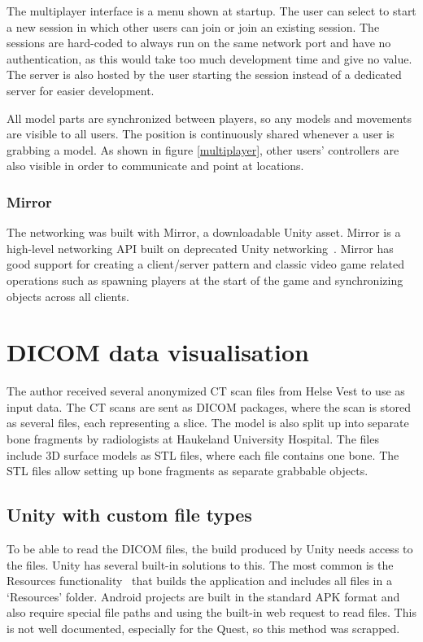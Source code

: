 \documentclass[a4paper]{report}
\begin{document}
The multiplayer interface is a menu shown at startup. The user can select to start a new session in which other users can join or join an existing session. The sessions are hard-coded to always run on the same network port and have no authentication, as this would take too much development time and give no value. The server is also hosted by the user starting the session instead of a dedicated server for easier development.

All model parts are synchronized between players, so any models and movements are visible to all users. The position is continuously shared whenever a user is grabbing a model. As shown in figure \ref{multiplayer}, other users' controllers are also visible in order to communicate and point at locations.


\subsubsection{Mirror}
The networking was built with Mirror, a downloadable Unity asset. Mirror is a high-level networking API built on deprecated Unity networking~\cite{noauthor_mirror_nodate}. Mirror has good support for creating a client/server pattern and classic video game related operations such as spawning players at the start of the game and synchronizing objects across all clients.

\section{DICOM data visualisation}
The author received several anonymized CT scan files from Helse Vest to use as input data. The CT scans are sent as DICOM packages, where the scan is stored as several files, each representing a slice.
The model is also split up into separate bone fragments by radiologists at Haukeland University Hospital. The files include 3D surface models as STL files, where each file contains one bone. The STL files allow setting up bone fragments as separate grabbable objects.


\subsection{Unity with custom file types}

To be able to read the DICOM files, the build produced by Unity needs access to the files. Unity has several built-in solutions to this.
The most common is the Resources functionality~\cite{resourcesload_unity_nodate} that builds the application and includes all files in a `Resources' folder. Android projects are built in the standard APK format and also require special file paths and using the built-in web request to read files. This is not well documented, especially for the Quest, so this method was scrapped.
\end{document}
